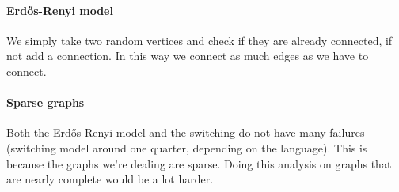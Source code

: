 \documentclass[paper=a4, fontsize=11pt]{scrartcl} %
\begin{document}
\paragraph{Erd\H{o}s-Renyi model}
We simply take two random vertices and check if they are already connected, if not add a connection. In this way we connect as much edges as we have to connect.

\paragraph{Sparse graphs}
Both the Erd\H{o}s-Renyi model and the switching do not have many failures (switching model around one quarter, depending on the language). This is because the graphs we're dealing are sparse. Doing this analysis on graphs that are nearly complete would be a lot harder.
\end{document}
